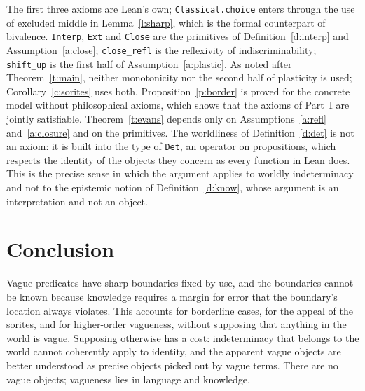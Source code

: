 \documentclass{situationist-preprint}
\begin{document}
The first three axioms are Lean's own; \texttt{Classical.choice} enters through the use of excluded middle in Lemma~\ref{l:sharp}, which is the formal counterpart of bivalence. \texttt{Interp}, \texttt{Ext} and \texttt{Close} are the primitives of Definition~\ref{d:interp} and Assumption~\ref{a:close}; \texttt{close\_refl} is the reflexivity of indiscriminability; \texttt{shift\_up} is the first half of Assumption~\ref{a:plastic}. As noted after Theorem~\ref{t:main}, neither monotonicity nor the second half of plasticity is used; Corollary~\ref{c:sorites} uses both. Proposition~\ref{p:border} is proved for the concrete model without philosophical axioms, which shows that the axioms of Part~I are jointly satisfiable. Theorem~\ref{t:evans} depends only on Assumptions~\ref{a:refl} and~\ref{a:closure} and on the primitives. The worldliness of Definition~\ref{d:det} is not an axiom: it is built into the type of \texttt{Det}, an operator on propositions, which respects the identity of the objects they concern as every function in Lean does. This is the precise sense in which the argument applies to worldly indeterminacy and not to the epistemic notion of Definition~\ref{d:know}, whose argument is an interpretation and not an object.

\section{Conclusion}

Vague predicates have sharp boundaries fixed by use, and the boundaries cannot be known because knowledge requires a margin for error that the boundary's location always violates. This accounts for borderline cases, for the appeal of the sorites, and for higher-order vagueness, without supposing that anything in the world is vague. Supposing otherwise has a cost: indeterminacy that belongs to the world cannot coherently apply to identity, and the apparent vague objects are better understood as precise objects picked out by vague terms. There are no vague objects; vagueness lies in language and knowledge.
\end{document}
